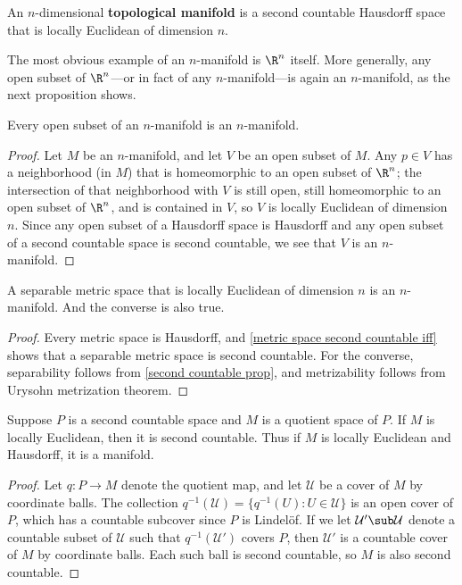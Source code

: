 \begin{definition}
An $n$-dimensional \textbf{topological manifold} is a second countable Hausdorff space that is locally Euclidean of dimension $n$.
\end{definition}
The most obvious example of an $n$-manifold is $\R^n$ itself. More generally, any open subset of $\R^n$---or in fact of any $n$-manifold---is again an $n$-manifold, as the next proposition shows.
\begin{proposition}
Every open subset of an $n$-manifold is an $n$-manifold.
\end{proposition}
\begin{proof}
Let $M$ be an $n$-manifold, and let $V$ be an open subset of $M$. Any $p\in V$ has a neighborhood (in $M$) that is homeomorphic to an open subset of $\R^n$; the intersection of that neighborhood with $V$ is still open, still homeomorphic to an open subset of $\R^n$, and is contained in $V$, so $V$ is locally Euclidean of dimension $n$. Since any open subset of a Hausdorff space is Hausdorff and any open subset of a second countable space is second countable, we see that $V$ is an $n$-manifold.
\end{proof}
\begin{theorem}
A separable metric space that is locally Euclidean of dimension $n$ is an $n$-manifold. And the converse is also true.
\end{theorem}
\begin{proof}
Every metric space is Hausdorff, and \cref{metric space second countable iff} shows that a separable metric space is second countable. For the converse, separability follows from \cref{second countable prop}, and metrizability follows from Urysohn metrization theorem.
\end{proof}
\begin{proposition}\label{manifold quotient is manifold}
Suppose $P$ is a second countable space and $M$ is a quotient space of $P$. If $M$ is locally Euclidean, then it is second countable. Thus if $M$ is locally Euclidean and Hausdorff, it is a manifold.
\end{proposition}
\begin{proof}
Let $q:P\to M$ denote the quotient map, and let $\mathcal{U}$ be a cover of $M$ by coordinate balls. The collection $q^{-1}(\mathcal{U})=\{q^{-1}(U):U\in\mathcal{U}\}$ is an open cover of $P$, which has a countable subcover since $P$ is Lindel\"of. If we let $\mathcal{U}'\sub\mathcal{U}$ denote a countable subset of $\mathcal{U}$ such that $q^{-1}(\mathcal{U}')$ covers $P$, then $\mathcal{U}'$ is a countable cover of $M$ by coordinate balls. Each such ball is second countable, so $M$ is also second countable.
\end{proof}
